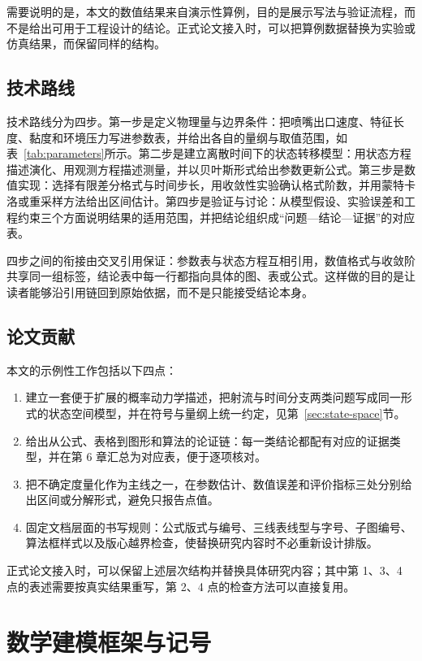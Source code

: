 需要说明的是，本文的数值结果来自演示性算例，目的是展示写法与验证流程，而不是给出可用于工程设计的结论。正式论文接入时，可以把算例数据替换为实验或仿真结果，而保留同样的结构。

\subsection{技术路线}

技术路线分为四步。第一步是定义物理量与边界条件：把喷嘴出口速度、特征长度、黏度和环境压力写进参数表，并给出各自的量纲与取值范围，如表~\ref{tab:parameters}所示。第二步是建立离散时间下的状态转移模型：用状态方程描述演化、用观测方程描述测量，并以贝叶斯形式给出参数更新公式。第三步是数值实现：选择有限差分格式与时间步长，用收敛性实验确认格式阶数，并用蒙特卡洛或重采样方法给出区间估计。第四步是验证与讨论：从模型假设、实验误差和工程约束三个方面说明结果的适用范围，并把结论组织成“问题—结论—证据”的对应表。

四步之间的衔接由交叉引用保证：参数表与状态方程互相引用，数值格式与收敛阶共享同一组标签，结论表中每一行都指向具体的图、表或公式。这样做的目的是让读者能够沿引用链回到原始依据，而不是只能接受结论本身。

\subsection{论文贡献}

本文的示例性工作包括以下四点：
\begin{enumerate}
  \item 建立一套便于扩展的概率动力学描述，把射流与时间分支两类问题写成同一形式的状态空间模型，并在符号与量纲上统一约定，见第~\ref{sec:state-space}节。
  \item 给出从公式、表格到图形和算法的论证链：每一类结论都配有对应的证据类型，并在第 6 章汇总为对应表，便于逐项核对。
  \item 把不确定度量化作为主线之一，在参数估计、数值误差和评价指标三处分别给出区间或分解形式，避免只报告点值。
  \item 固定文档层面的书写规则：公式版式与编号、三线表线型与字号、子图编号、算法框样式以及版心越界检查，使替换研究内容时不必重新设计排版。
\end{enumerate}

正式论文接入时，可以保留上述层次结构并替换具体研究内容；其中第 1、3、4 点的表述需要按真实结果重写，第 2、4 点的检查方法可以直接复用。

\section{数学建模框架与记号}


